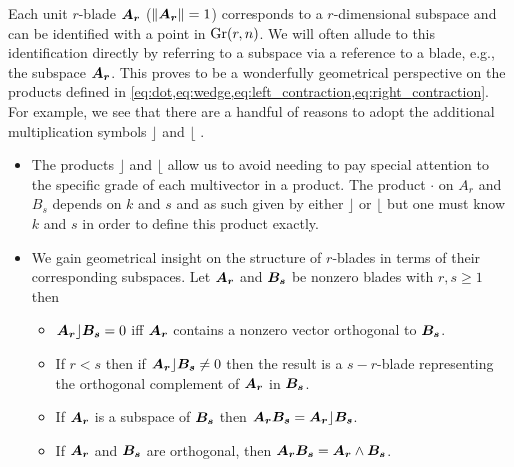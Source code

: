 Each unit $r$-blade $\boldsymbol{A_r}$ ($\|\boldsymbol{A_r}\|=1$) corresponds to a $r$-dimensional subspace and can be identified with a point in $\operatorname{Gr}(r,n)$. We will often allude to this identification directly by referring to a subspace via a reference to a blade, e.g., the subspace $\boldsymbol{A_r}$. This proves to be a wonderfully geometrical perspective on the products defined in \cref{eq:dot,eq:wedge,eq:left_contraction,eq:right_contraction}. For example, we see that there are a handful of reasons to adopt the additional multiplication symbols $\rfloor$ and $\lfloor$ \cite{chisolm_geometric_2012}. 
\begin{itemize}
    \item The products $\rfloor$ and $\lfloor$ allow us to avoid needing to pay special attention to the specific grade of each multivector in a product. The product $\cdot$ on $A_r$ and $B_s$ depends on $k$ and $s$ and as such given by either $\rfloor$ or $\lfloor$ but one must know $k$ and $s$ in order to define this product exactly. 
    \item We gain geometrical insight on the structure of $r$-blades in terms of their corresponding subspaces. Let $\boldsymbol{A_r}$ and $\boldsymbol{B_s}$ be nonzero blades with $r,s\geq 1$ then
    \begin{itemize}
        \item $\boldsymbol{A_r} \rfloor \boldsymbol{B_s} =0$ iff $\boldsymbol{A_r}$ contains a nonzero vector orthogonal to $\boldsymbol{B_s}$.
        \item If $r<s$ then if $\boldsymbol{A_r}\rfloor \boldsymbol{B_s} \neq 0$ then the result is a $s-r$-blade representing the orthogonal complement of $\boldsymbol{A_r}$ in $\boldsymbol{B_s}$.
        \item If $\boldsymbol{A_r}$ is a subspace of $\boldsymbol{B_s}$ then $\boldsymbol{A_r}\boldsymbol{B_s} = \boldsymbol{A_r}\rfloor \boldsymbol{B_s}$.
        \item If $\boldsymbol{A_r}$ and $\boldsymbol{B_s}$ are orthogonal, then $\boldsymbol{A_r}\boldsymbol{B_s} = \boldsymbol{A_r} \wedge \boldsymbol{B_s}$.
    \end{itemize}
\end{itemize}

